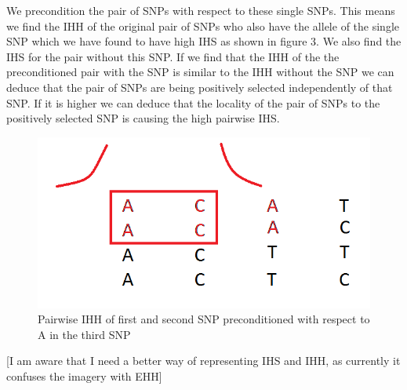 \documentclass[a4paper,12pt]{article}
\begin{document}
\newpage
We precondition the pair of SNPs with respect to these single SNPs. This means we find the IHH of the original pair of SNPs who also have the allele of the single SNP which we have found to have high IHS as shown in figure 3. We also find the IHS for the pair without this SNP. If we find that the IHH of the the preconditioned pair with the SNP is similar to the IHH without the SNP we can deduce that the pair of SNPs are being positively selected independently of that SNP. If it is higher we can deduce that the locality of the pair of SNPs to the positively selected SNP is causing the high pairwise IHS.

\begin{figure}[h!]
  \centering
    \includegraphics[scale=0.5]{conditional4}
  \caption{Pairwise IHH of first and second SNP preconditioned  with respect to A in the third SNP}
\end{figure}

[I am aware that I need a better way of representing IHS and IHH, as currently it confuses the imagery with EHH]
\end{document}
